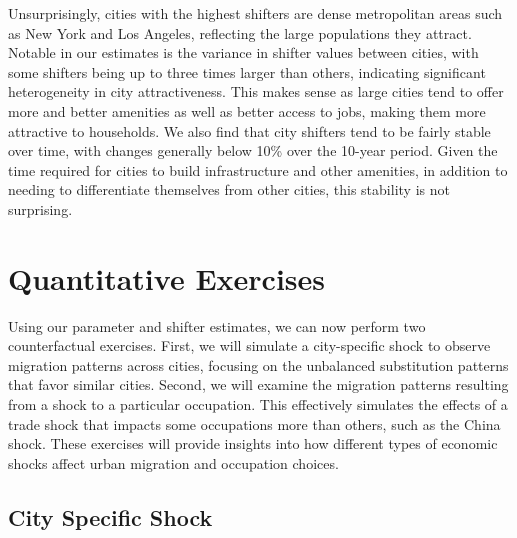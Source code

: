 \documentclass[10pt]{article}
\begin{document}
Unsurprisingly, cities with the highest shifters are dense metropolitan areas such as New York and Los Angeles, reflecting the large populations they attract. Notable in our estimates is the variance in shifter values between cities, with some shifters being up to three times larger than others, indicating significant heterogeneity in city attractiveness. This makes sense as large cities tend to offer more and better amenities as well as better access to jobs, making them more attractive to households. We also find that city shifters tend to be fairly stable over time, with changes generally below 10\% over the 10-year period. Given the time required for cities to build infrastructure and other amenities, in addition to needing to differentiate themselves from other cities, this stability is not surprising.

\section{Quantitative Exercises}

Using our parameter and shifter estimates, we can now perform two counterfactual exercises. First, we will simulate a city-specific shock to observe migration patterns across cities, focusing on the unbalanced substitution patterns that favor similar cities. Second, we will examine the migration patterns resulting from a shock to a particular occupation. This effectively simulates the effects of a trade shock that impacts some occupations more than others, such as the China shock. These exercises will provide insights into how different types of economic shocks affect urban migration and occupation choices.

\subsection{City Specific Shock}
\end{document}
